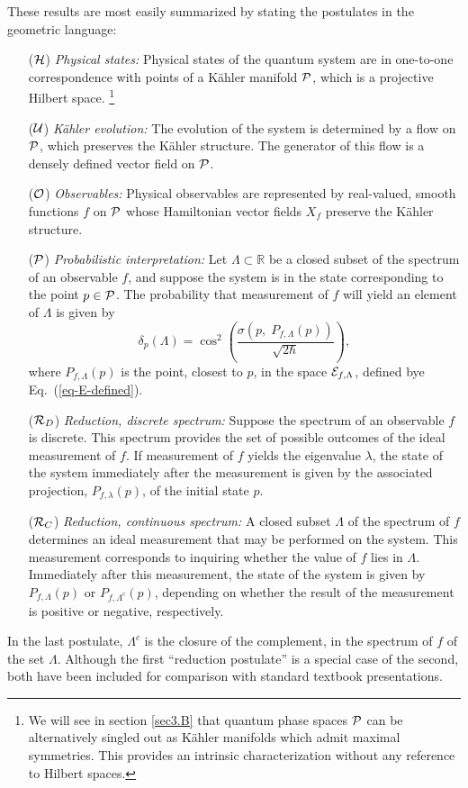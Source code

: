 \documentclass[12pt,aps,eqsecnum,tighten]{revtex4-2}
\def\P{{\cal P}}
\newcommand{\eqn}[1]{Eq.~(\ref{#1})}
\def\Bbb{}
\def\R{\mathbb R}
\begin{document}
These results are most easily summarized by stating the postulates in
the geometric language:
%
\begin{itemize}
\item[(${\cal H}$)] {\it Physical states: } Physical states of the
quantum system are in one-to-one correspondence with points of a
K\"ahler manifold ${\cal P}$, which is a projective Hilbert space.%
%
\footnote{We will see in section \ref{sec3.B} that quantum phase
spaces $\P$ can be alternatively singled out as K\"ahler manifolds
which admit maximal symmetries.  This provides an intrinsic
characterization without any reference to Hilbert spaces.}
%
\item[(${\cal U}$)] {\it K\"ahler evolution: } The evolution of the
system is determined by a flow on $\P$, which preserves the K\"ahler
structure. The generator of this flow is a densely defined vector
field on $\P$.
%
\item[(${\cal O}$)] {\it Observables: } Physical observables are
represented by real-valued, smooth functions $f$ on $\P$ whose
Hamiltonian vector fields $X_f$ preserve the K\"ahler structure.
%
\item[(${\cal P}$)] {\it Probabilistic interpretation: } Let $\Lambda
\subset \R$ be a closed subset of the spectrum of an observable $f$,
and suppose the system is in the state corresponding to the point $p
\in \P$.  The probability that measurement of $f$ will yield an
element of $\Lambda$ is given by
%
\begin{equation}
\delta_p(\Lambda) = \cos^2\left(\frac {\sigma(p, \;{\Bbb P}_{f,\Lambda}
(p))} {\sqrt{2\hbar}} \right),
\end{equation}
%	
where ${\Bbb P}_{f,\Lambda}(p)$ is the point, closest to $p$, in the
space ${\cal E}_{f, \Lambda}$, defined bye \eqn{eq-E-defined}.
%
\item[(${\cal R}_D$)] {\it Reduction, discrete spectrum: } Suppose the
spectrum of an observable $f$ is discrete.  This spectrum provides the
set of possible outcomes of the ideal measurement of $f$.  If
measurement of $f$ yields the eigenvalue $\lambda$, the state of the
system immediately after the measurement is given by the associated
projection, ${\Bbb P}_{f,\lambda}(p)$, of the initial state $p$.
%
\item[(${\cal R}_C$)] {\it Reduction, continuous spectrum: } A closed
subset $\Lambda$ of the spectrum of $f$ determines an ideal
measurement that may be performed on the system.  This measurement
corresponds to inquiring whether the value of $f$ lies in $\Lambda$.
Immediately after this measurement, the state of the system is given
by ${\Bbb P}_{f,\Lambda}(p)$ or ${\Bbb P}_{f,\Lambda^c}(p)$, depending
on whether the result of the measurement is positive or negative,
respectively.
\end{itemize}
%
In the last postulate, $\Lambda^c$ is the closure of the complement,
in the spectrum of $f$ of the set $\Lambda$.  Although the first
``reduction postulate''  is a special case of the second, both have
been included for comparison with standard textbook presentations.
\end{document}

